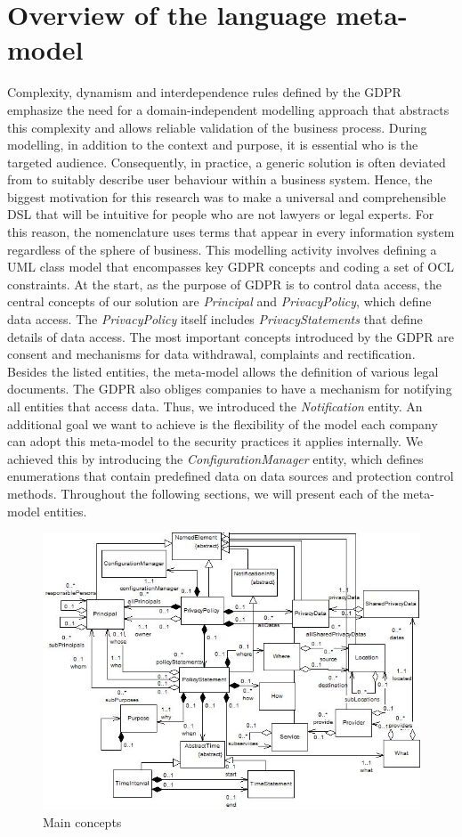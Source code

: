 \documentclass[11pt,english]{article}
\begin{document}
\section{Overview of the language meta-model}
Complexity, dynamism and interdependence rules defined by the GDPR emphasize the need for a domain-independent modelling approach that abstracts this complexity and allows reliable validation of the business process. During modelling, in addition to the context and purpose, it is essential who is the targeted audience. Consequently, in practice, a generic solution is often deviated from to suitably describe user behaviour within a business system. Hence, the biggest motivation for this research was to make a universal and comprehensible DSL that will be intuitive for people who are not lawyers or legal experts. For this reason, the nomenclature uses terms that appear in every information system regardless of the sphere of business. This modelling activity involves defining a UML class model that encompasses key GDPR concepts and coding a set of OCL constraints. At the start, as the purpose of GDPR is to control data access, the central concepts of our solution are \emph{Principal} and \emph{PrivacyPolicy}, which define data access. The \emph{PrivacyPolicy} itself includes \emph{PrivacyStatements} that define details of data access. The most important concepts introduced by the GDPR are consent and mechanisms for data withdrawal, complaints and rectification. Besides the listed entities, the meta-model allows the definition of various legal documents. The GDPR also obliges companies to have a mechanism for notifying all entities that access data. Thus, we introduced the \emph{Notification} entity. An additional goal we want to achieve is the flexibility of the model each company can adopt this meta-model to the security practices it applies internally. We achieved this by introducing the \emph{ConfigurationManager} entity, which defines enumerations that contain predefined data on data sources and protection control methods. Throughout the following sections, we will present each of the meta-model entities.
\begin{figure}[H]
    \centering
    \includegraphics[width=12.5cm]{images/mainconcepts.jpg}
    \caption{Main concepts}
    \label{fig:mainconcepts}
\end{figure}
\end{document}

